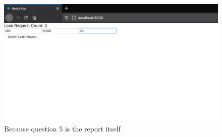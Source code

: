 \documentclass[a4paper, 12pt]{article}
\begin{document}
\begin{figure}[h!]
	\centering
	\includegraphics[width=\textwidth]{./Images/webSubmit}
	\caption{Because question 5 is the report itself}
	\label{fig:webSubmit}
\end{figure}
\end{document}
